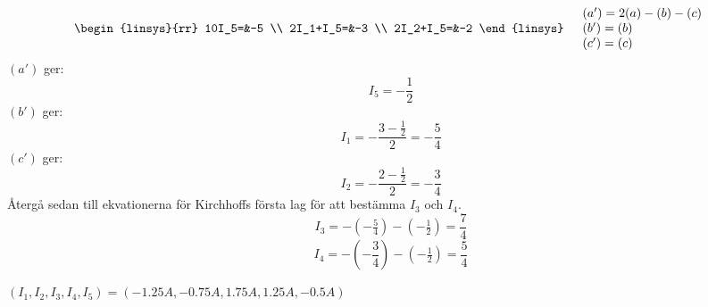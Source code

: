 \begin{task}{1.20}
\begin{align*}
		&\begin{linsys}{rr}
			10I_5=&-5 \\
			2I_1+I_5=&-3 \\
			2I_2+I_5=&-2 
		\end{linsys}
		&\begin{array}{l}
			(a')=2(a)-(b)-(c) \\
			(b')=(b) \\
			(c')=(c)
		\end{array}
	\end{align*}
	$(a')$ ger:
	\[I_5=-\frac{1}{2}\]
	$(b')$ ger:
	\[I_1=-\frac{3-\frac{1}{2}}{2}=-\frac{5}{4}\]
	$(c')$ ger:
	\[I_2=-\frac{2-\frac{1}{2}}{2}=-\frac{3}{4}\]
	Återgå sedan till ekvationerna för Kirchhoffs första lag för att bestämma $I_3$ och $I_4$.
	\[I_3=-(-\tfrac{5}{4})-(-\tfrac{1}{2})=\frac{7}{4}\]
	\[I_4=-(-\frac{3}{4})-(-\tfrac{1}{2})=\frac{5}{4}\]

	\ans $(I_1,I_2,I_3,I_4,I_5)=(-1.25A,-0.75A,1.75A,1.25A,-0.5A)$
\end{task}


